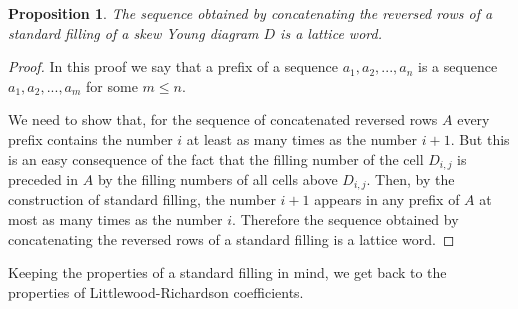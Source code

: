 \documentclass[letterpaper,11pt]{article}
\newtheorem{proposition}{Proposition}
\begin{document}
	\begin{proposition}
		The sequence obtained by concatenating the reversed rows of a standard filling of a skew Young diagram $D$ is a lattice word.
	\end{proposition}
	\begin{proof}
		In this proof we say that a prefix of a sequence $a_1, a_2, ..., a_n$ is a sequence $a_1, a_2, ..., a_m$ for some $m \le n$.
		
		We need to show that, for the sequence of concatenated reversed rows $A$ every prefix contains the number $i$ at least as many times as the number $i+1$. But this is an easy consequence of the fact that the filling number of the cell $D_{i,j}$ is preceded in $A$ by the filling numbers of all cells above $D_{i,j}$. Then, by the construction of standard filling, the number $i+1$ appears in any prefix of $A$ at most as many times as the number $i$. Therefore the sequence obtained by concatenating the reversed rows of a standard filling is a lattice word.
	\end{proof}

	Keeping the properties of a standard filling in mind, we get back to the properties of Littlewood-Richardson coefficients.
\end{document}
